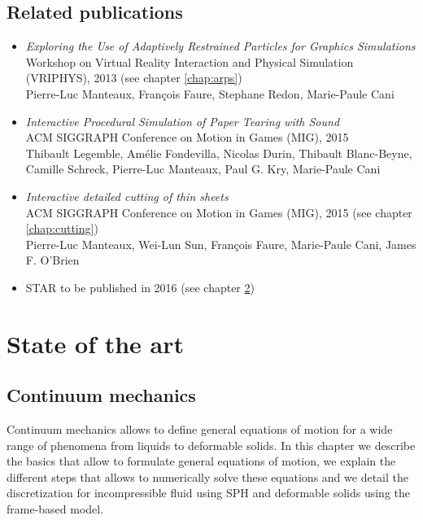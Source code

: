 \documentclass[11pt, oneside, a4paper]{memoir}
\begin{document}
\section{Related publications}
\begin{itemize}
    \item \cite{Manteaux2013} \emph{Exploring the Use of Adaptively Restrained Particles for Graphics Simulations} \\
    Workshop on Virtual Reality Interaction and Physical Simulation (VRIPHYS), 2013 (see chapter \ref{chap:arps})\\
    Pierre-Luc Manteaux, François Faure, Stephane Redon, Marie-Paule Cani
    \item \cite{Lejemble2015} \emph{Interactive Procedural Simulation of Paper Tearing with Sound} \\
    ACM SIGGRAPH Conference on Motion in Games (MIG), 2015 \\
    Thibault Legemble, Amélie Fondevilla, Nicolas Durin, Thibault Blanc-Beyne, Camille Schreck, Pierre-Luc Manteaux, Paul G. Kry, Marie-Paule Cani
    \item \cite{Manteaux2015} \emph{Interactive detailed cutting of thin sheets} \\
        ACM SIGGRAPH Conference on Motion in Games (MIG), 2015 (see chapter \ref{chap:cutting})\\
        Pierre-Luc Manteaux, Wei-Lun Sun, François Faure, Marie-Paule Cani, James F. O'Brien
	\item STAR to be published in 2016 (see chapter \ref{chap:star})
\end{itemize}

\chapter{State of the art}
\label{chap:star}

\section{Continuum mechanics}

Continuum mechanics allows to define general equations of motion for a wide range of phenomena from liquids to deformable solids. In this chapter we describe the basics that allow to formulate general equations of motion, we explain the different steps that allows to numerically solve these equations and we detail the discretization for incompressible fluid using SPH and deformable solids using the frame-based model.
\end{document}
